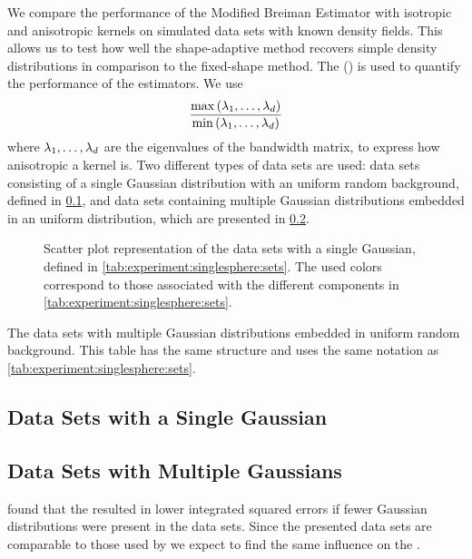 We compare the performance of the Modified Breiman Estimator with isotropic and anisotropic kernels on simulated data sets with known density fields. This allows us to test how well the shape-adaptive method recovers simple density distributions in comparison to the fixed-shape method.
The \mse (\MSE) is used to quantify the performance of the estimators. We use
\begin{equation*}\label{eq:experiment:anisotropicmetric}
	\frac{\max\left(\lambda_1, \dotsc, \lambda_d \right)}{\min\left(\lambda_1, \dotsc, \lambda_d \right)}
\end{equation*}
where $\lambda_1, \dotsc, \lambda_d$ are the eigenvalues of the bandwidth matrix, to express how anisotropic a kernel is.
Two different types of data sets are used: data sets consisting of a single Gaussian distribution with an uniform random background, defined in \cref{s:experiment:singlesphere},  and data sets containing multiple Gaussian distributions embedded in an uniform distribution, which are presented in \cref{s:experiment:multisphere}.

\begin{figure*}
	\centering
	
	\caption{Scatter plot representation of the data sets with a single Gaussian, defined in \cref{tab:experiment:singlesphere:sets}. The used colors correspond to those associated with the different components in \cref{tab:experiment:singlesphere:sets}.}
	\label{fig:experiment:singlesphere:sets}
\end{figure*}

\begin{table*}
	\centering
	
	\caption{The data sets with multiple Gaussian distributions embedded in uniform random background. This table has the same structure and uses the same notation as \cref{tab:experiment:singlesphere:sets}.}
	\label{tab:experiment:multisphere:sets}
\end{table*}

\subsection{Data Sets with a Single Gaussian}
\label{s:experiment:singlesphere}


\subsection{Data Sets with Multiple Gaussians}
\label{s:experiment:multisphere}


\textcite{ferdosi2011comparison} found that the \mbe resulted in lower integrated squared errors if fewer Gaussian distributions were present in the data sets. Since the presented data sets are comparable to those used by \citeauthor{ferdosi2011comparison} we expect to find the same influence on the \mse.
